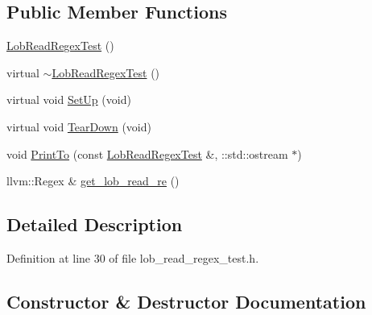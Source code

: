 \subsection*{Public Member Functions}
\begin{DoxyCompactItemize}
\item 
\hyperlink{classclang_1_1tidy_1_1pagesjaunes_1_1test_1_1_lob_read_regex_test_a18e0531d39396514d3226b1279d90b41}{Lob\+Read\+Regex\+Test} ()
\item 
virtual \hyperlink{classclang_1_1tidy_1_1pagesjaunes_1_1test_1_1_lob_read_regex_test_ae1356d863e1fa90c01bef13b283e746e}{$\sim$\+Lob\+Read\+Regex\+Test} ()
\item 
virtual void \hyperlink{classclang_1_1tidy_1_1pagesjaunes_1_1test_1_1_lob_read_regex_test_ad3e4de27f5261021c082868bb78022d2}{Set\+Up} (void)
\item 
virtual void \hyperlink{classclang_1_1tidy_1_1pagesjaunes_1_1test_1_1_lob_read_regex_test_ac3437fe37aa4175e230c621874845eb8}{Tear\+Down} (void)
\item 
void \hyperlink{classclang_1_1tidy_1_1pagesjaunes_1_1test_1_1_lob_read_regex_test_a75b7052dcbdb35215fa2e1361bbf4c88}{Print\+To} (const \hyperlink{classclang_1_1tidy_1_1pagesjaunes_1_1test_1_1_lob_read_regex_test}{Lob\+Read\+Regex\+Test} \&, \+::std\+::ostream $\ast$)
\item 
llvm\+::\+Regex \& \hyperlink{classclang_1_1tidy_1_1pagesjaunes_1_1test_1_1_lob_read_regex_test_a8f1510eca033bfef9c6aee621eaba98b}{get\+\_\+lob\+\_\+read\+\_\+re} ()
\end{DoxyCompactItemize}


\subsection{Detailed Description}


Definition at line 30 of file lob\+\_\+read\+\_\+regex\+\_\+test.\+h.



\subsection{Constructor \& Destructor Documentation}
\mbox{\label{classclang_1_1tidy_1_1pagesjaunes_1_1test_1_1_lob_read_regex_test_a18e0531d39396514d3226b1279d90b41}} 
